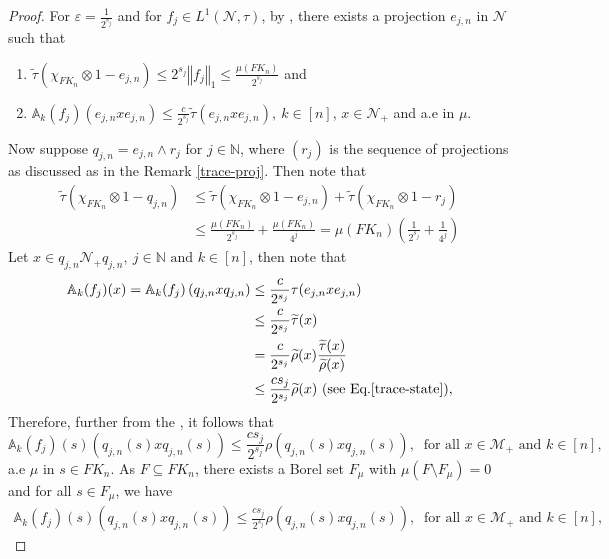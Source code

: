 \documentclass[11pt]{amsart}
\theoremstyle{definition}
\theoremstyle{myremark}
\numberwithin{equation}{section}
\def\A{\mathbb A}
\def\N{\mathbb N}
\newcommand{\CM}{\mathcal{M}}
\newcommand{\CN}{\mathcal{N}}
\newcommand{\eps}{\varepsilon}
\newcommand{\norm}[1]{\left\Vert#1\right\Vert}
\begin{document}
\begin{proof}
For  $ \eps = \frac{1}{ 2^{s_j}}$ and for $f_j \in L^1(\CN, \tau)$,  by ,  there exists a projection $ e_{j,n} $ in $\CN$ such that 
\begin{enumerate}\setlength\itemsep{.7em} 
        \item $ \widetilde{ \tau }( \chi_{FK_n}\otimes 1-e_{j, n}) \leq 2^{s_j}\norm{ f_j}_1 \leq \frac{\mu( FK_n)}{2^{s_j}} $ and 
        \item $   \A_k(f_j)(  e_{j, n} x e_{j, n} ) \leq \frac{c }{2^{s_j}} \widetilde{\tau}( e_{j, n} x e_{j, n}), ~k \in [n]$, $ x \in \CN_+$ and  a.e in $\mu$.
\end{enumerate}
Now suppose $q_{j, n} = e_{j, n} \wedge r_j $ for $ j \in \N$, where $(r_j)$ is the sequence of projections as discussed as in the Remark \ref{trace-proj}. Then note that
\begin{align*}
 \widetilde{ \tau }( \chi_{FK_n}\otimes 1-q_{j, n})    
&\leq  \widetilde{ \tau }( \chi_{FK_n}\otimes 1-e_{j, n}) + \widetilde{ \tau }( \chi_{FK_n}\otimes 1-r_j)\\
&\leq \frac{\mu(FK_n)}{2^{s_j}}  + \frac{\mu(FK_n)}{4^j}= \mu(FK_n) \left( \frac{1 }{2^{s_j}} + \frac{1}{4^j}\right) 
\end{align*}
Let 
$ x \in q_{j, n} \CN_+ q_{j, n}, ~j \in \N \text{ and } k \in [n]$, then note that 
\begin{align*}
\A_k(f_j)( x ) = \A_k(f_j) \left( q_{j, n} x q_{j, n} \right) &\leq \frac{c }{2^{s_j}} \tau( e_{j, n} x e_{j, n})\\
&\leq \frac{c }{2^{s_j}} \widetilde{\tau}( x)\\
&= \frac{c }{2^{s_j}}  \widetilde{\rho}( x) \frac{\widetilde{\tau}( x)}{\widetilde{\rho}( x)} \\ 
&\leq  \frac{c s_j }{2^{s_j}}\widetilde{\rho}( x)~  (\text{see Eq.}  \ref{trace-state}),
\end{align*}
Therefore, further from  the , it follows that 
$$ \A_k(f_j)(s) ( q_{j,n }(s) x q_{j,n }(s) )
\leq \frac{c s_j }{2^{s_j}} \rho( q_{j,n }(s) x q_{j,n }(s)), ~ \text{ for all } x \in \CM_+ \text{ and } k \in [n],$$
a.e $\mu$ in  $s \in FK_n$. 
As $ F \subseteq FK_n$, there exists a Borel set $F_\mu$ with $\mu( F\setminus F_\mu) = 0$ and for all $ s \in F_\mu$, we have 
\begin{align}
\A_k(f_j)(s) ( q_{j,n }(s) x q_{j,n }(s) )
\leq \frac{c s_j }{2^{s_j}} \rho( q_{j,n }(s) x q_{j,n }(s)), ~ \text{ for all } x \in \CM_+ \text{ and } k \in [n],    
\end{align}



\end{proof}
\end{document}
